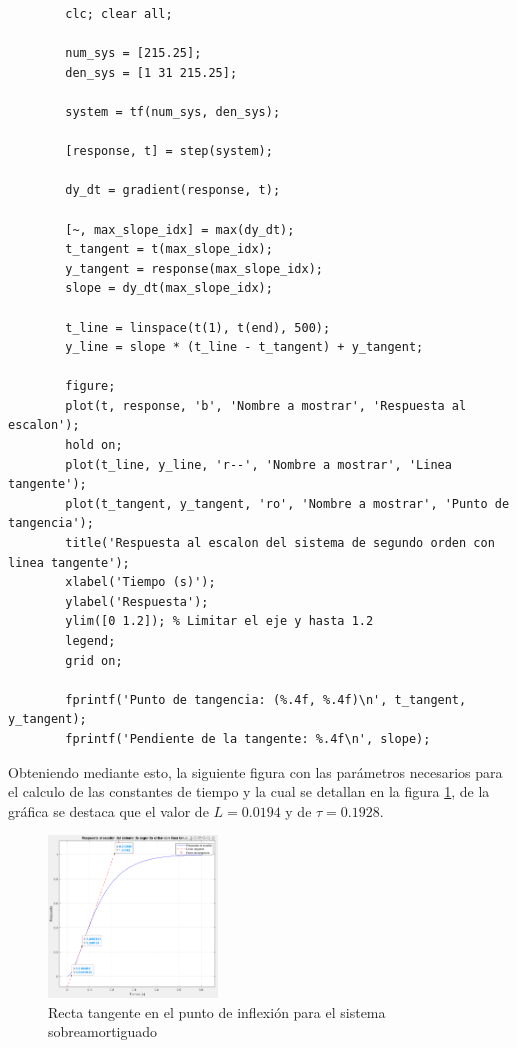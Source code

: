 \documentclass[conference]{IEEEtran}
\begin{document}
	\begin{lstlisting}
		clc; clear all;
		
		num_sys = [215.25];
		den_sys = [1 31 215.25];
		
		system = tf(num_sys, den_sys);
		
		[response, t] = step(system);
		
		dy_dt = gradient(response, t);
		
		[~, max_slope_idx] = max(dy_dt);
		t_tangent = t(max_slope_idx);
		y_tangent = response(max_slope_idx);
		slope = dy_dt(max_slope_idx);
		
		t_line = linspace(t(1), t(end), 500);
		y_line = slope * (t_line - t_tangent) + y_tangent;
		
		figure;
		plot(t, response, 'b', 'Nombre a mostrar', 'Respuesta al escalon');
		hold on;
		plot(t_line, y_line, 'r--', 'Nombre a mostrar', 'Linea tangente');
		plot(t_tangent, y_tangent, 'ro', 'Nombre a mostrar', 'Punto de tangencia');
		title('Respuesta al escalon del sistema de segundo orden con linea tangente');
		xlabel('Tiempo (s)');
		ylabel('Respuesta');
		ylim([0 1.2]); % Limitar el eje y hasta 1.2
		legend;
		grid on;
		
		fprintf('Punto de tangencia: (%.4f, %.4f)\n', t_tangent, y_tangent);
		fprintf('Pendiente de la tangente: %.4f\n', slope);
	\end{lstlisting}
	
	Obteniendo mediante esto, la siguiente figura con las parámetros necesarios para el calculo de las constantes de tiempo y la cual se detallan en la figura \ref{fig:sobreamortiguado-tangente}, de la gráfica se destaca que el valor de $L=0.0194$ y de $\tau = 0.1928$.
	
	
	
	\begin{figure}[h]
		\centering
		\includegraphics[width=0.4\textwidth]{media1/sobreamortiguado-tangente}
		\caption{Recta tangente en el punto de inflexión para el sistema sobreamortiguado}
		\label{fig:sobreamortiguado-tangente}
	\end{figure}
	
\end{document}
